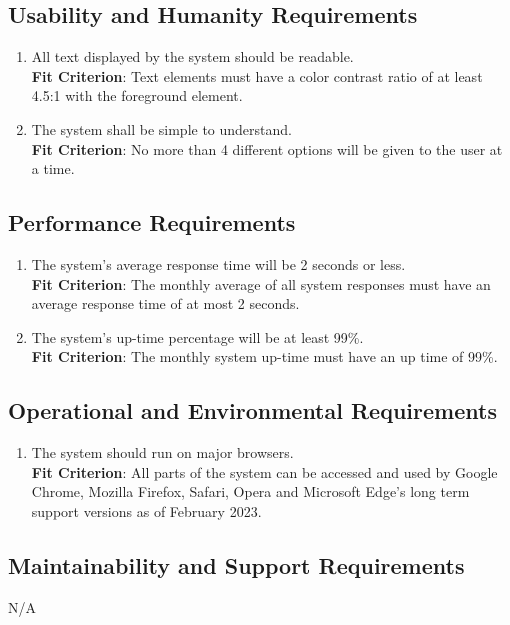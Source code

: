 \documentclass[12pt, titlepage]{article}
\begin{document}
\subsection{Usability and Humanity Requirements}
\begin{enumerate}[label=NFR.\arabic*, resume]
    \item All text displayed by the system should be readable.
    \\\textbf{Fit Criterion}: Text elements must have a color contrast ratio of at least 4.5:1 with the foreground element.
    \label{NFR.2}
    \item The system shall be simple to understand. \label{NFR.3}
    \\\textbf{Fit Criterion}: No more than 4 different options will be given to the user at a time.
\end{enumerate}
\subsection{Performance Requirements}
\begin{enumerate}[label=NFR.\arabic*, resume]
    \item The system's average response time will be 2 seconds or less. \label{NFR.4}
    \\\textbf{Fit Criterion}: The monthly average of all system responses must have an average response time of at most 2 seconds.
    \item The system's up-time percentage will be at least 99\%.
    \\\textbf{Fit Criterion}: The monthly system up-time must have an up time of 99\%.
    \label{NFR.5}
\end{enumerate}
\subsection{Operational and Environmental Requirements}
\begin{enumerate}[label=NFR.\arabic*, resume]
    \item The system should run on major browsers. \label{NFR.6}
    \\\textbf{Fit Criterion}: All parts of the system can be accessed and used by Google Chrome, Mozilla Firefox, Safari, Opera and Microsoft Edge's long term support versions as of February 2023.
\end{enumerate}
\subsection{Maintainability and Support Requirements}
N/A
\end{document}
